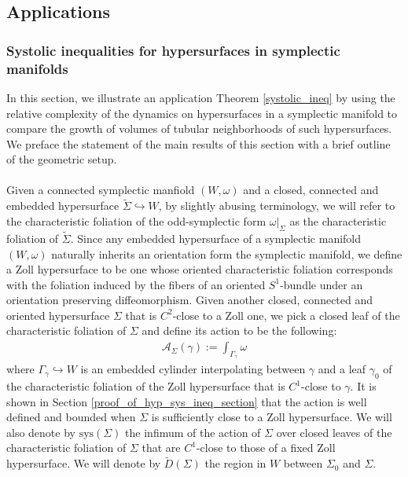 \documentclass[11pt]{amsart}
\theoremstyle{plain}
\theoremstyle{definition}
\theoremstyle{remark}
\begin{document}
\subsection{Applications}\label{Applications_of_sys_ineq}
\subsubsection{Systolic inequalities for hypersurfaces in symplectic manifolds}
In this section, we illustrate an application Theorem \ref{systolic_ineq} by using the relative complexity of the dynamics on hypersurfaces in a symplectic manifold to compare the growth of volumes of tubular neighborhoods of such hypersurfaces. We preface the statement of the main results of this section with a brief outline of the geometric setup.\\
\\
Given a connected symplectic manfiold $(W,\omega)$ and a closed, connected and embedded hypersurface $\tilde \Sigma \hookrightarrow W$, by slightly abusing terminology, we will refer to the characteristic foliation of the odd-symplectic form $\omega\vert_{\Sigma}$ as the characteristic foliation of $\tilde \Sigma$. Since any embedded hypersurface of a symplectic manifold $(W,\omega)$ naturally inherits an orientation form the symplectic manifold, we define a Zoll hypersurface to be one whose oriented characteristic foliation corresponds with the foliation induced by the fibers of an oriented $S^1$-bundle under an orientation preserving diffeomorphism. Given another closed, connected and oriented hypersurface $\Sigma$ that is $C^2$-close to a Zoll one, we pick a closed leaf of the characteristic foliation of $\Sigma$ and define its action to be the following:
\begin{align}
    \mathcal{A}_{\Sigma}(\gamma):= \int_{\Gamma_{\gamma}} \omega
\end{align}
where $\Gamma_{\gamma} \hookrightarrow W$ is an embedded cylinder interpolating between $\gamma$ and a leaf $\gamma_0$ of the characteristic foliation of the Zoll hypersurface that is $C^1$-close to $\gamma$. It is shown in Section \ref{proof_of_hyp_sys_ineq_section} that the action is well defined and bounded when $\Sigma$ is sufficiently close to a Zoll hypersurface. We will also denote by $\text{sys}(\Sigma)$ the infimum of the action of $\Sigma$ over closed leaves of the characteristic foliation of $\Sigma$ that are $C^1$-close to those of a fixed Zoll hypersurface. We will denote by $\tilde D(\Sigma)$ the region in $W$ between $\Sigma_0$ and $\Sigma$.\\
\end{document}

